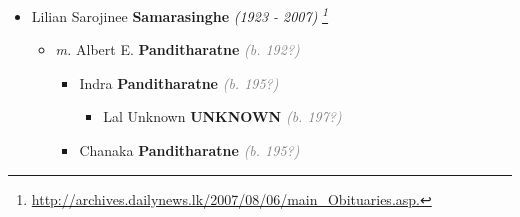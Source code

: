 \documentclass[10pt, openany]{book}
\begin{document}
\begin{itemize}
{\begin{itemize}
{\begin{itemize}
{{{\footnote{\url{https://www.sundaytimes.lk/991010/splus2.html.}}
G.V.P. Samarasinghe, Permanent Secretary of Defence and Foreign Affairs, who too was a rugby hooker for Royal College and was affectionately called  (\footnote{\url{https://www.sundaytimes.lk/991010/splus2.html}}).
\footnote{\url{http://www.worldgenweb.org/lkawgw/gen3809.html.}}}}
\begin{itemize}
\item{\textit{m.} Hilda \textbf{Abeygunawardene} \textcolor{gray}{\textit{(b. 192?)}} Daughter of  E Y D Cadmus Abeygunawardene \textbf{Abeygunawardene} \textcolor{gray}{\textit{(b. 189?)}} \textcolor{slteal}{\textit{See  \autoref{00003729} \textit{, p. \pageref{00003729} }}}  \&  Leelawathie \textbf{Unknown} \textcolor{gray}{\textit{(b. 189?)}} \textcolor{slteal}{\textit{See  \autoref{00003730} \textit{, p. \pageref{00003730} }}}   \label{couple:00003727:00003728} \begin{itemize}
\item{Ajith \textbf{Samarasinghe} \textcolor{gray}{\textit{(b. 195?)}}
 }
\item{Shiromani \textbf{Samarasinghe} \textcolor{gray}{\textit{(b. 195?)}}
 }
\item{Kamal \textbf{Samarasinghe} \textcolor{gray}{\textit{(b. 195?)}}
 }
\end{itemize}}
\end{itemize}
   }
\item{Lilian Sarojinee \textbf{Samarasinghe} \textcolor{slorange}{\textit{(1923 - 2007)}} \textcolor{slmaroon}{\textit{\footnote{\url{http://archives.dailynews.lk/2007/08/06/main_Obituaries.asp.}}}}
\begin{itemize}
\item{\textit{m.} Albert E. \textbf{Panditharatne} \textcolor{gray}{\textit{(b. 192?)}}   \label{couple:00003708:00003709} \begin{itemize}
\item{Indra \textbf{Panditharatne} \textcolor{gray}{\textit{(b. 195?)}}
\begin{itemize}
\item{Lal Unknown \textbf{UNKNOWN} \textcolor{gray}{\textit{(b. 197?)}}
  }
\end{itemize}
 }
\item{Chanaka \textbf{Panditharatne} \textcolor{gray}{\textit{(b. 195?)}}
}
\end{itemize}}
\end{itemize}}
\end{itemize}}
\end{itemize}}
\end{itemize}
\end{document}
